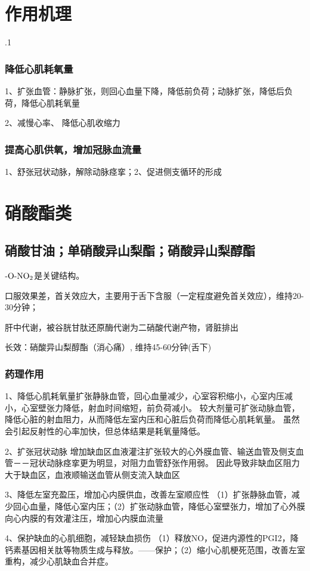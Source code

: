 \documentclass[UTF8]{ctexbook}
\begin{document}
\section{作用机理}.1
\subsubsection{降低心肌耗氧量}
1、扩张血管：静脉扩张，则回心血量下降，降低前负荷；动脉扩张，降低后负荷，降低心肌耗氧量

2、减慢心率、 降低心肌收缩力
\subsubsection{提高心肌供氧，增加冠脉血流量}
1、舒张冠状动脉，解除动脉痉挛；2、促进侧支循环的形成

\section{硝酸酯类}
\subsection{硝酸甘油；单硝酸异山梨酯；硝酸异山梨醇酯}
\(\textup{-O-NO}_{2}\)是关键结构。

口服效果差，首关效应大，主要用于舌下含服（一定程度避免首关效应），维持20-30分钟；

肝中代谢，被谷胱甘肽还原酶代谢为二硝酸代谢产物，肾脏排出

长效：硝酸异山梨醇酯（消心痛）, 维持45-60分钟(舌下)

\subsubsection{药理作用}
1、降低心肌耗氧量扩张静脉血管，回心血量减少，心室容积缩小，心室内压减小，心室壁张力降低，射血时间缩短，前负荷减小。
较大剂量可扩张动脉血管，降低心脏的射血阻力，从而降低左室内压和心脏后负荷而降低心肌耗氧量。
虽然会引起反射性的心率加快，但总体结果是耗氧量降低。

2、扩张冠状动脉 增加缺血区血液灌注扩张较大的心外膜血管、输送血管及侧支血管－－冠状动脉痉挛更为明显，对阻力血管舒张作用弱。
因此导致非缺血区阻力大于缺血区，血液顺输送血管从侧支流入缺血区

3、降低左室充盈压，增加心内膜供血，改善左室顺应性
（1）扩张静脉血管，减少回心血量，降低心室内压；（2）扩张动脉血管，降低心室壁张力，增加了心外膜向心内膜的有效灌注压，增加心内膜血流量

4、保护缺血的心肌细胞，减轻缺血损伤
（1）释放NO，促进内源性的PGI2，降钙素基因相关肽等物质生成与释放。——保护；（2）缩小心肌梗死范围，改善左室重构，减少心肌缺血合并症。
\end{document}
